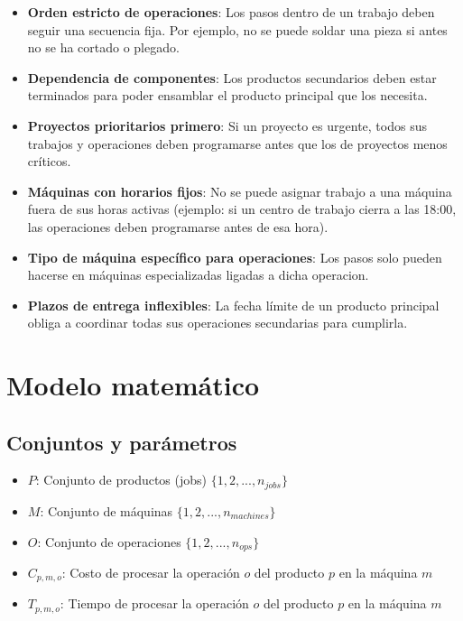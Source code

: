\documentclass[preprint,12pt,authoryear]{elsarticle}
\begin{document}
\begin{itemize}
\item \textbf{Orden estricto de operaciones}: Los pasos dentro de un trabajo deben seguir una secuencia fija. Por ejemplo, no se puede soldar una pieza si antes no se ha cortado o plegado.  

\item \textbf{Dependencia de componentes}: Los productos secundarios deben estar terminados para poder ensamblar el producto principal que los necesita.  

\item \textbf{Proyectos prioritarios primero}: Si un proyecto es urgente, todos sus trabajos y operaciones deben programarse antes que los de proyectos menos críticos.  

\item \textbf{Máquinas con horarios fijos}: No se puede asignar trabajo a una máquina fuera de sus horas activas (ejemplo: si un centro de trabajo cierra a las 18:00, las operaciones deben programarse antes de esa hora).  

\item \textbf{Tipo de máquina específico para operaciones}: Los pasos solo pueden hacerse en máquinas especializadas ligadas a dicha operacion.    

\item \textbf{Plazos de entrega inflexibles}: La fecha límite de un producto principal obliga a coordinar todas sus operaciones secundarias para cumplirla.

\end{itemize}






\section{Modelo matemático}

\subsection{Conjuntos y parámetros}
\begin{itemize}[leftmargin=1.5cm]
    \item $P$: Conjunto de productos (jobs) $\{1, 2, ..., n_{jobs}\}$
    \item $M$: Conjunto de máquinas $\{1, 2, ..., n_{machines}\}$
    \item $O$: Conjunto de operaciones $\{1, 2, ..., n_{ops}\}$
    \item $C_{p,m,o}$: Costo de procesar la operación $o$ del producto $p$ en la máquina $m$
    \item $T_{p,m,o}$: Tiempo de procesar la operación $o$ del producto $p$ en la máquina $m$
\end{itemize}
\end{document}
